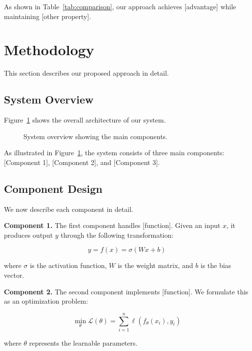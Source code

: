 \documentclass[conference]{IEEEtran}
\theoremstyle{plain}
\theoremstyle{definition}
\begin{document}
As shown in Table~\ref{tab:comparison}, our approach achieves [advantage]
while maintaining [other property].

\section{Methodology}
\label{sec:method}

This section describes our proposed approach in detail.

\subsection{System Overview}

Figure~\ref{fig:overview} shows the overall architecture of our system.

\begin{figure}[htbp]
\centering
{}
\caption{System overview showing the main components.}
\label{fig:overview}
\end{figure}

As illustrated in Figure~\ref{fig:overview}, the system consists of three
main components: [Component 1], [Component 2], and [Component 3].

\subsection{Component Design}

We now describe each component in detail.

\textbf{Component 1.} The first component handles [function]. Given an input
$x$, it produces output $y$ through the following transformation:

\begin{equation}
y = f(x) = \sigma(Wx + b)
\label{eq:component1}
\end{equation}

where $\sigma$ is the activation function, $W$ is the weight matrix, and
$b$ is the bias vector.

\textbf{Component 2.} The second component implements [function]. We
formulate this as an optimization problem:

\begin{equation}
\min_{\theta} \mathcal{L}(\theta) = \sum_{i=1}^{n} \ell(f_\theta(x_i), y_i)
\label{eq:optimization}
\end{equation}

where $\theta$ represents the learnable parameters.
\end{document}
